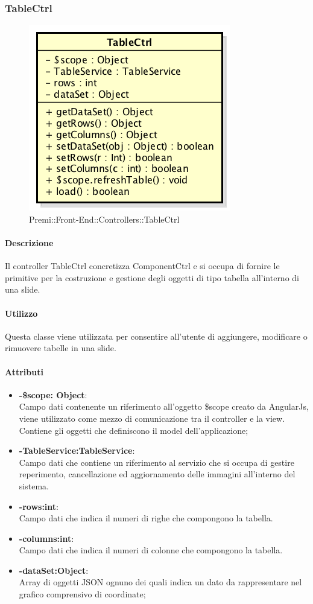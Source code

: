 \subsubsection{TableCtrl}
\begin{figure}[h]
	\centering
	\includegraphics[width=0.4\linewidth]{img/premi_front_end_controllers_tablectrl}
	\caption[Premi::Front-End::Controllers::TableCtrl]{Premi::Front-End::Controllers::TableCtrl}
\end{figure}
\paragraph{Descrizione}
Il controller TableCtrl concretizza ComponentCtrl e si occupa di fornire le primitive per la costruzione e gestione degli oggetti di tipo tabella all'interno di una slide.

\paragraph{Utilizzo}
Questa classe viene utilizzata per consentire all'utente di aggiungere, modificare o rimuovere tabelle in una slide.

\paragraph{Attributi}
\begin{itemize}
	\item \textbf{-\$scope: Object}:\\
	Campo dati contenente un riferimento all'oggetto \$scope creato da AngularJs, viene utilizzato come mezzo di comunicazione tra il controller e la view. Contiene gli oggetti che definiscono il model dell'applicazione;
	\item  \textbf{-TableService:TableService}:\\
	Campo dati che contiene un riferimento al servizio che si occupa di gestire reperimento, cancellazione ed aggiornamento delle immagini all'interno del sistema.
	\item\textbf{-rows:int}:\\
	Campo dati che indica il numeri di righe che compongono la tabella.
	\item\textbf{-columns:int}:\\
	Campo dati che indica il numeri di colonne che compongono la tabella.
	\item\textbf{-dataSet:Object}:\\
	Array di oggetti JSON ognuno dei quali indica un dato da rappresentare nel grafico comprensivo di coordinate;
\end{itemize}

